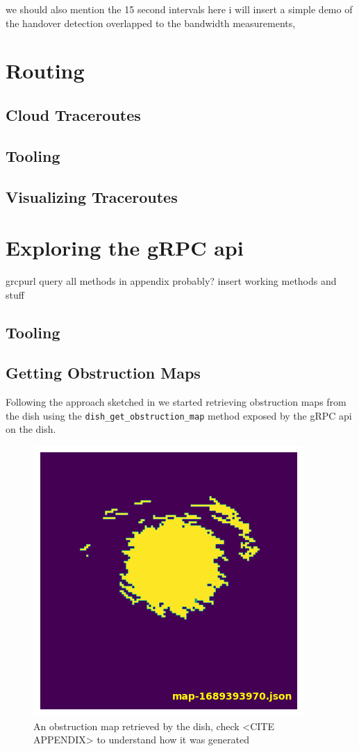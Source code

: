 \documentclass[IN,11pt,twoside,openright,bachelor,english]{tumthesis}
\begin{document}
we should also mention the 15 second intervals
here i will insert a simple demo of the handover detection overlapped to the bandwidth measurements, 



\chapter{Routing}
\section{Cloud Traceroutes}
\section{Tooling}
\section{Visualizing Traceroutes}


\chapter{Exploring the gRPC api}

grcpurl
query all methods
in appendix probably? insert working methods and stuff


\section{Tooling}
\section{Getting Obstruction Maps}
Following the approach sketched in \cite{izhikevich2023democratizing} we started retrieving obstruction maps from the dish using the \texttt{dish\_get\_obstruction\_map} method exposed by the gRPC api on the dish.



\begin{figure}
	\centering
	\includegraphics[]{img/obstruction_map_finale.png}
	\caption{An obstruction map retrieved by the dish, check <CITE APPENDIX> to understand how it was generated}
\end{figure}
\end{document}
